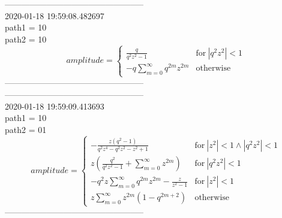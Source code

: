 --------------------------------------------------\\
2020-01-18 19:59:08.482697\\
path1 = 10\\
path2 = 10\\
$$amplitude = \begin{cases} \frac{q}{q^{2} z^{2} - 1} & \text{for}\: \left|{q^{2} z^{2}}\right| < 1 \\- q \sum_{m=0}^{\infty} q^{2 m} z^{2 m} & \text{otherwise} \end{cases}$$
--------------------------------------------------\\
--------------------------------------------------\\
2020-01-18 19:59:09.413693\\
path1 = 10\\
path2 = 01\\
$$amplitude = \begin{cases} - \frac{z \left(q^{2} - 1\right)}{q^{2} z^{4} - q^{2} z^{2} - z^{2} + 1} & \text{for}\: \left|{z^{2}}\right| < 1 \wedge \left|{q^{2} z^{2}}\right| < 1 \\z \left(\frac{q^{2}}{q^{2} z^{2} - 1} + \sum_{m=0}^{\infty} z^{2 m}\right) & \text{for}\: \left|{q^{2} z^{2}}\right| < 1 \\- q^{2} z \sum_{m=0}^{\infty} q^{2 m} z^{2 m} - \frac{z}{z^{2} - 1} & \text{for}\: \left|{z^{2}}\right| < 1 \\z \sum_{m=0}^{\infty} z^{2 m} \left(1 - q^{2 m + 2}\right) & \text{otherwise} \end{cases}$$
--------------------------------------------------\\
